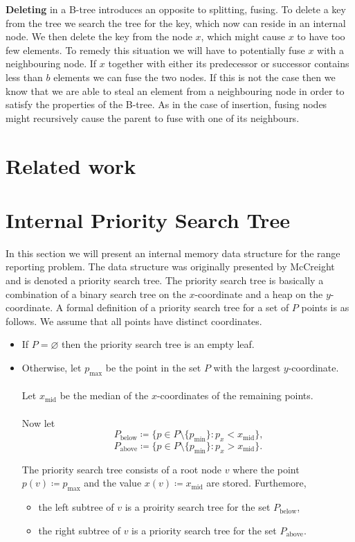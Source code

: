 \documentclass[twoside,11pt,openright]{report}
\begin{document}
\textbf{Deleting} in a B-tree introduces an opposite to splitting, fusing. To delete a key from the tree we search the tree for the key, which now can reside in an internal node. We then delete the key from the node $x$, which might cause $x$ to have too few elements. To remedy this situation we will have to potentially fuse $x$ with a neighbouring node. If $x$ together with either its predecessor or successor contains less than $b$ elements we can fuse the two nodes. If this is not the case then we know that we are able to steal an element from a neighbouring node in order to satisfy the properties of the B-tree. As in the case of insertion, fusing nodes might recursively cause the parent to fuse with one of its neighbours.

\chapter{Related work}


\chapter{Internal Priority Search Tree}
In this section we will present an internal memory data structure for the range reporting problem. The data structure was originally presented by McCreight~\cite{DBLP:journals/siamcomp/McCreight85} and is denoted a priority search tree. The priority search tree is basically a combination of a binary search tree on the $x$-coordinate and a heap on the $y$-coordinate. A formal definition of a priority search tree for a set of $P$ points is as follows. We assume that all points have distinct coordinates.

\begin{itemize}
	\item If $P = \varnothing$ then the priority search tree is an empty leaf.
	\item Otherwise, let $p_\text{max}$ be the point in the set $P$ with the largest $y$-coordinate. \\ \\
			Let $x_{\text{mid}}$ be the median of the $x$-coordinates of the remaining points. \\ \\ Now let
			$$ P_\text{below} \coloneqq \{p \in P \setminus \{p_\text{min} \} : p_x < x_\text{mid} \}\text{,}$$
			$$ P_\text{above} \coloneqq \{p \in P \setminus \{p_\text{min} \} : p_x > x_\text{mid} \}\text{.}$$
			
			The priority search tree consists of a root node $v$ where the point \\
			$p(v) \coloneqq p_{\text{max}}$ and the value $x(v) \coloneqq x_{\text{mid}}$ are stored. Furthemore,
			\begin{itemize}[label=$\bullet$]
				\item the left subtree of $v$ is a proirity search tree for the set $P_{\text{below}}$,
				\item the right subtree of $v$ is a priority search tree for the set $P_{\text{above}}$.
			\end{itemize}
\end{itemize}
\end{document}
